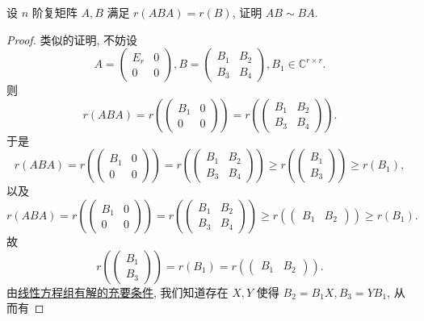 \documentclass[../../main.tex]{subfiles}%
\begin{document}
\begin{example}
设 \( n \) 阶复矩阵 \( A,B \) 满足 \( r(ABA) = r(B) \), 证明 \( AB \sim BA \).
\end{example}
\begin{proof}
类似的证明, 不妨设
\[
A = \begin{pmatrix} E_r & 0 \\ 0 & 0 \end{pmatrix}, B = \begin{pmatrix} B_1 & B_2 \\ B_3 & B_4 \end{pmatrix}, B_1 \in \mathbb{C}^{r \times r}.
\]
则
\[
r(ABA) = r\left( \begin{pmatrix} B_1 & 0 \\ 0 & 0 \end{pmatrix} \right) = r\left( \begin{pmatrix} B_1 & B_2 \\ B_3 & B_4 \end{pmatrix} \right).
\]
于是
\[
r(ABA) = r\left( \begin{pmatrix} B_1 & 0 \\ 0 & 0 \end{pmatrix} \right) = r\left( \begin{pmatrix} B_1 & B_2 \\ B_3 & B_4 \end{pmatrix} \right) \geqslant r\left( \begin{pmatrix} B_1 \\ B_3 \end{pmatrix} \right) \geqslant r(B_1),
\]
以及
\[
r(ABA) = r\left( \begin{pmatrix} B_1 & 0 \\ 0 & 0 \end{pmatrix} \right) = r\left( \begin{pmatrix} B_1 & B_2 \\ B_3 & B_4 \end{pmatrix} \right) \geqslant r\left( \begin{pmatrix} B_1 & B_2 \end{pmatrix} \right) \geqslant r(B_1).
\]
故
\[
r\left( \begin{pmatrix} B_1 \\ B_3 \end{pmatrix} \right) = r(B_1) = r\left( \begin{pmatrix} B_1 & B_2 \end{pmatrix} \right).
\]
由\hyperref[theorem:线性方程组有解的充要条件]{线性方程组有解的充要条件}, 我们知道存在 \( X,Y \) 使得 \( B_2 = B_1X, B_3 = YB_1 \), 从而有

\end{proof}
\end{document}
